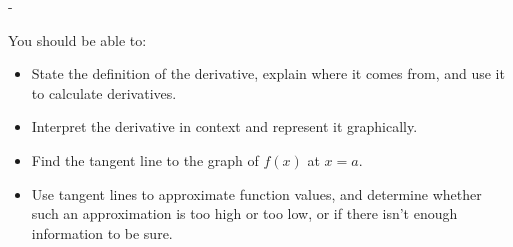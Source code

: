 \documentclass{article}
\makeatletter
\newlength{\tipmargin}
\renewenvironment{framed}{
  \setlength{\tipmargin}{\textwidth-\linewidth}
  \advance\@totalleftmargin-\tipmargin
  \def\FrameCommand{\hspace{\tipmargin}\fbox}%
  \advance\linewidth\tipmargin
  \MakeFramed {\advance\hsize-\width \FrameRestore}%
}
{\endMakeFramed}
\makeatother
\begin{document}

\begin{problemonly}
  \begin{framed}

You should be able to:
    \begin{itemize}[topsep=0pt,partopsep=0pt,parsep=8pt,itemsep=0pt]
    \item State the definition of the derivative, explain where it comes from, and use it to calculate derivatives.

    \item Interpret the derivative in context and represent it graphically.

    \item Find the tangent line to the graph of $f(x)$ at $x = a$. 

    \item Use tangent lines to approximate function values, and determine whether such an approximation is too high or too low, or if there isn't enough information to be sure.
    \end{itemize}
  \end{framed}
\end{problemonly}
\end{document}
